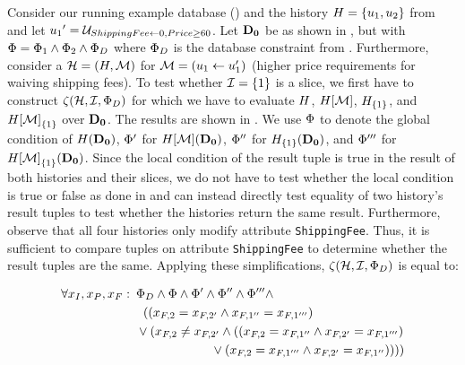 \begin{exam}\label{ex:testing-slice-candidates}
Consider our running example database () and the history $H = \{u_1,u_2\}$ from  and let ${u_1}' = \mathcal{U}_{ShippingFee \gets 0,Price \geq 60}$. Let $\mathbf{D_0}$ be as shown in , but with $\Phi = \Phi_1\land \Phi_2 \land \Phi_{D}$ where $\Phi_{D}$ is the database constraint from . Furthermore, consider a \abbrHW $\mathcal{H} = (H, \mathcal{M})$ for $\mathcal{M} = ( u_1 \gets u_1' )$ (higher price requirements for waiving shipping fees). To test whether $\mathcal{I} = \{1\}$ is a slice, we first have to construct $\zeta({\mathcal{H}},{\mathcal{I}},{\Phi_{D}})$ for which we have to evaluate $H$, $H[\mathcal{M}]$, $H_{\{1\}}$, and ${H[\mathcal{M}]}_{\{1\}}$ over $\mathbf{D_0}$. The results are shown in . We use $\Phi$ to denote the global condition of $H(\mathbf{D_0})$, $\Phi'$ for $H[\mathcal{M}](\mathbf{D_0})$, $\Phi''$ for $H_{\{1\}}(\mathbf{D_0})$, and $\Phi'''$ for ${H[\mathcal{M}]}_{\{1\}}(\mathbf{D_0})$.
  Since the local condition of the result tuple is true in the result of both histories and their slices, we do not have to test whether the local condition is true or false as done in  and can instead directly test equality of two history's result tuples to test whether the histories return the same result. Furthermore, observe that all four histories only modify attribute \texttt{ShippingFee}. Thus, it is sufficient to compare tuples on attribute \texttt{ShippingFee} to determine whether the result tuples are the same. Applying these simplifications, $\zeta({\mathcal{H}},{\mathcal{I}},{\Phi_{D}})$ is equal to:

  \begin{align*}
    \forall x_{I}, x_{P}, x_{F}:\,\,\, &\Phi_{D} \land \Phi \land \Phi' \land \Phi'' \land \Phi''' \land\\
                                 &\hspace{2mm}(
                                   (x_{F,2} = x_{F,2'} \land x_{F,1''} = x_{F,1'''})\\
                                 &\lor (x_{F,2} \neq x_{F,2'} \land ((x_{F,2} = x_{F,1''} \land x_{F,2'} = x_{F,1'''})\\
                                 &\hspace{2.1cm}\vee (x_{F,2} = x_{F,1'''} \land x_{F,2'} = x_{F,1''})))
      )
  \end{align*}


\end{exam}
